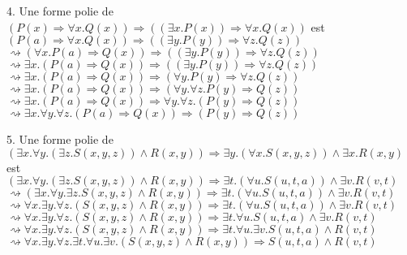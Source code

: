 \documentclass[11pt,letterpaper]{article}
\newcommand\tab[1][12pt]{\hspace*{#1}}
\begin{document}
4. Une forme polie de $(P(x) \Rightarrow \forall x.Q(x)) \Rightarrow ((\exists x.P(x))  \Rightarrow \forall x.Q(x))$ est\\\tab
$(P(a) \Rightarrow \forall x.Q(x)) \Rightarrow ((\exists y.P(y))  \Rightarrow \forall z.Q(z))$\\\tab
$\rightsquigarrow (\forall x.P(a) \Rightarrow Q(x)) \Rightarrow ((\exists y.P(y))  \Rightarrow \forall z.Q(z))$\\\tab
$\rightsquigarrow \exists x.(P(a) \Rightarrow Q(x)) \Rightarrow ((\exists y.P(y))  \Rightarrow \forall z.Q(z))$\\\tab
$\rightsquigarrow \exists x.(P(a) \Rightarrow Q(x)) \Rightarrow (\forall y.P(y)  \Rightarrow \forall z.Q(z))$\\\tab
$\rightsquigarrow \exists x.(P(a) \Rightarrow Q(x)) \Rightarrow (\forall y.\forall z.P(y)  \Rightarrow Q(z))$\\\tab
$\rightsquigarrow \exists x.(P(a) \Rightarrow Q(x)) \Rightarrow \forall y.\forall z.(P(y)  \Rightarrow Q(z))$\\\tab
$\rightsquigarrow \exists x.\forall y.\forall z.(P(a) \Rightarrow Q(x)) \Rightarrow (P(y)  \Rightarrow Q(z))$

\vspace{13px}

5. Une forme polie de $(\exists x.\forall y.(\exists z.S(x,y,z)) \wedge R(x,y)) \Rightarrow \exists y.(\forall x.S(x,y,z)) \wedge \exists x.R(x,y)$ est\\\tab
$(\exists x.\forall y.(\exists z.S(x,y,z)) \wedge R(x,y)) \Rightarrow \exists t.(\forall u.S(u,t,a)) \wedge \exists v.R(v,t)$\\\tab
$\rightsquigarrow (\exists x.\forall y.\exists z.S(x,y,z) \wedge R(x,y)) \Rightarrow \exists t.(\forall u.S(u,t,a)) \wedge \exists v.R(v,t)$\\\tab
$\rightsquigarrow \forall x.\exists y.\forall z.(S(x,y,z) \wedge R(x,y)) \Rightarrow \exists t.(\forall u.S(u,t,a)) \wedge \exists v.R(v,t)$\\\tab
$\rightsquigarrow \forall x.\exists y.\forall z.(S(x,y,z) \wedge R(x,y)) \Rightarrow \exists t.\forall u.S(u,t,a) \wedge \exists v.R(v,t)$\\\tab
$\rightsquigarrow \forall x.\exists y.\forall z.(S(x,y,z) \wedge R(x,y)) \Rightarrow \exists t.\forall u.\exists v.S(u,t,a) \wedge R(v,t)$\\\tab
$\rightsquigarrow \forall x.\exists y.\forall z.\exists t.\forall u.\exists v.(S(x,y,z) \wedge R(x,y)) \Rightarrow S(u,t,a) \wedge R(v,t)$
\end{document}
